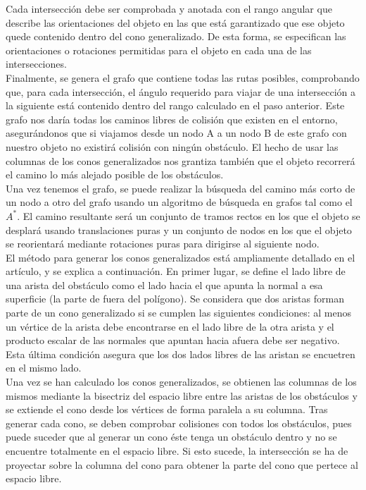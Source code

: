 Cada intersección debe ser comprobada y anotada con el rango angular que describe las orientaciones del objeto en las que está garantizado que ese objeto quede contenido dentro del cono generalizado. De esta forma, se especifican las orientaciones o rotaciones permitidas para el objeto en cada una de las intersecciones.\\

Finalmente, se genera el grafo que contiene todas las rutas posibles, comprobando que, para cada intersección, el ángulo requerido para viajar de una intersección a la siguiente está contenido dentro del rango calculado en el paso anterior. Este grafo nos daría todas los caminos libres de colisión que existen en el entorno, asegurándonos que si viajamos desde un nodo A a un nodo B de este grafo con nuestro objeto no existirá colisión con ningún obstáculo. El hecho de usar las columnas de los conos generalizados nos grantiza también que el objeto recorrerá el camino lo más alejado posible de los obstáculos.\\

Una vez tenemos el grafo, se puede realizar la búsqueda del camino más corto de un nodo a otro del grafo usando un algoritmo de búsqueda en grafos tal como el $A^*$. El camino resultante será un conjunto de tramos rectos en los que el objeto se desplará usando translaciones puras y un conjunto de nodos en los que el objeto se reorientará mediante rotaciones puras para dirigirse al siguiente nodo.\\

El método para generar los conos generalizados está ampliamente detallado en el artículo, y se explica a continuación. En primer lugar, se define el lado libre de una arista del obstáculo como el lado hacia el que apunta la normal a esa superficie (la parte de fuera del polígono). Se considera que dos aristas forman parte de un cono generalizado si se cumplen las siguientes condiciones: al menos un vértice de la arista debe encontrarse en el lado libre de la otra arista y el producto escalar de las normales que apuntan hacia afuera debe ser negativo. Esta última condición asegura que los dos lados libres de las aristan se encuetren en el mismo lado.\\

Una vez se han calculado los conos generalizados, se obtienen las columnas de los mismos mediante la bisectriz del espacio libre entre las aristas de los obstáculos y se extiende el cono desde los vértices de forma paralela a su columna. Tras generar cada cono, se deben comprobar colisiones con todos los obstáculos, pues puede suceder que al generar un cono éste tenga un obstáculo dentro y no se encuentre totalmente en el espacio libre. Si esto sucede, la intersección se ha de proyectar sobre la columna del cono para obtener la parte del cono que pertece al espacio libre.\\

